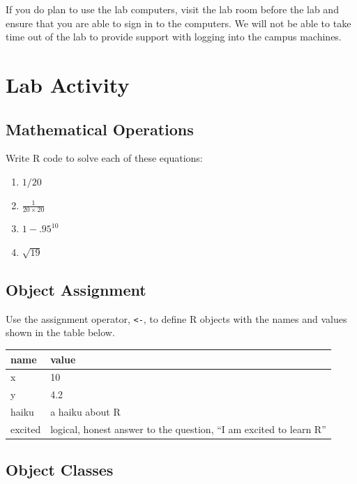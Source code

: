 \documentclass[
]{book}
\providecommand{\tightlist}{%
  \setlength{\itemsep}{0pt}\setlength{\parskip}{0pt}}
\begin{document}
If you do plan to use the lab computers, visit the lab room before the lab and ensure that you are able to sign in to the computers. We will not be able to take time out of the lab to provide support with logging into the campus machines.

\hypertarget{lab-activity}{%
\section{Lab Activity}\label{lab-activity}}

\hypertarget{mathematical-operations}{%
\subsection{Mathematical Operations}\label{mathematical-operations}}

Write R code to solve each of these equations:

\begin{enumerate}
\def\labelenumi{\arabic{enumi}.}
\tightlist
\item
  \(1/20\)
\item
  \(\frac{1}{20 \times 20}\)
\item
  \(1 - .95^{10}\)
\item
  \(\sqrt{19}\)
\end{enumerate}

\hypertarget{object-assignment}{%
\subsection{Object Assignment}\label{object-assignment}}

Use the assignment operator, \texttt{\textless{}-}, to define R objects with the names and values shown in the table below.

\begin{longtable}[]{@{}ll@{}}
\toprule
name & value \\
\midrule
\endhead
x & 10 \\
y & 4.2 \\
haiku & a haiku about R \\
excited & logical, honest answer to the question, ``I am excited to learn R'' \\
\bottomrule
\end{longtable}

\hypertarget{object-classes}{%
\subsection{Object Classes}\label{object-classes}}
\end{document}
